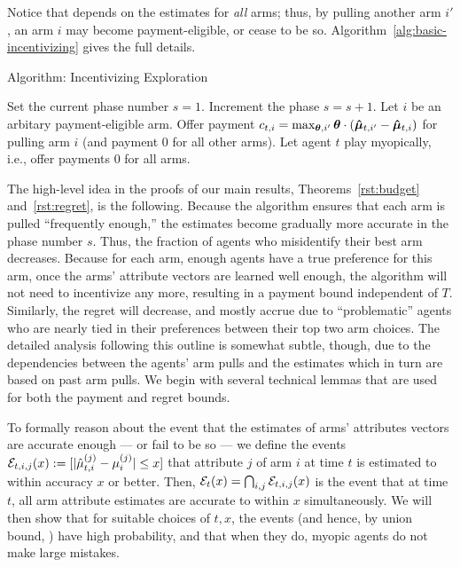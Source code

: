 Notice that  depends on the estimates for \emph{all}
arms; thus, by pulling another arm $i'$, an arm $i$ may become
payment-eligible, or cease to be so.
Algorithm~\ref{alg:basic-incentivizing} gives the full details.


\begin{algorithm}
\caption{Algorithm: Incentivizing Exploration \label{alg:basic-incentivizing}}
\begin{algorithmic}
\STATE Set the current phase number $s = 1$.
\STATE Increment the phase $s = s + 1$.
\ENDIF
{}
\STATE Let $i$ be an arbitary payment-eligible arm.
\STATE Offer payment
$c_{t,i} = \max_{\bm{\theta},i'} \bm{\theta} \cdot (\bm{\hat{\mu}}_{t,i'} - \bm{\hat{\mu}}_{t,i})$
for pulling arm $i$
(and payment 0 for all other arms).
\ELSE
\STATE Let agent $t$ play myopically, i.e., offer payments 0 for all arms.
\ENDIF
\ENDFOR
\end{algorithmic}
\end{algorithm}

The high-level idea in the proofs of our main results, Theorems~\ref{rst:budget} and~\ref{rst:regret},
is the following.
Because the algorithm ensures that each arm is pulled
``frequently enough,''
the estimates  become gradually more accurate in the
phase number $s$.
Thus, the fraction of agents who misidentify their best arm decreases.
Because for each arm, enough agents have a true preference for this
arm, once the arms' attribute vectors are learned well enough,
the algorithm will not need to incentivize any more,
resulting in a payment bound independent of $T$.
Similarly, the regret will decrease, and mostly accrue
due to ``problematic'' agents who are nearly tied in their preferences
between their top two arm choices.
The detailed analysis following this outline is somewhat subtle, though,
due to the dependencies between the agents' arm pulls and the
estimates which in turn are based on past arm pulls.
We begin with several technical lemmas that are used for both the
payment and regret bounds.

To formally reason about the event that the estimates of arms'
attributes vectors are accurate enough --- or fail to be so ---
we define the events
${\mathcal E}_{t,i,j}(x) := [|\hat{\mu}_{t,i}^{(j)} - \mu_{i}^{(j)}| \leq x]$
that attribute $j$ of arm $i$ at time $t$ is estimated to
within accuracy $x$ or better.
Then, 
${\mathcal E}_{t}(x) = \bigcap_{i,j} {\mathcal E}_{t,i,j}(x)$
is the event that at time $t$, all arm attribute
estimates are accurate to within $x$ simultaneously.
We will then show that for suitable choices of $t, x$,
the events 
(and hence, by union bound, )
have high probability,
and that when they do, myopic agents do not make large mistakes.



